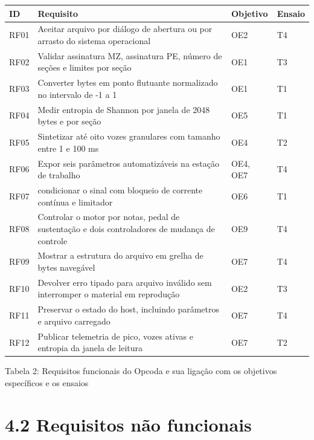 \documentclass[12pt,a4paper]{article}
\begin{document}
\begin{center}
\footnotesize
\setlength{\tabcolsep}{4pt}
\begin{tabular}{p{}|p{}|p{}|p{}}
\hline
\textbf{ID} & \textbf{Requisito} & \textbf{Objetivo} & \textbf{Ensaio} \\
\hline
RF01 & Aceitar arquivo por diálogo de abertura ou por arrasto do sistema operacional & OE2 & T4 \\
RF02 & Validar assinatura MZ, assinatura PE, número de seções e limites por seção & OE1 & T3 \\
RF03 & Converter bytes em ponto flutuante normalizado no intervalo de -1 a 1 & OE1 & T1 \\
RF04 & Medir entropia de Shannon por janela de 2048 bytes e por seção & OE5 & T1 \\
RF05 & Sintetizar até oito vozes granulares com tamanho entre 1 e 100 ms & OE4 & T2 \\
RF06 & Expor seis parâmetros automatizáveis na estação de trabalho & OE4, OE7 & T4 \\
RF07 & condicionar o sinal com bloqueio de corrente contínua e limitador & OE6 & T1 \\
RF08 & Controlar o motor por notas, pedal de sustentação e dois controladores de mudança de controle & OE9 & T4 \\
RF09 & Mostrar a estrutura do arquivo em grelha de bytes navegável & OE7 & T4 \\
RF10 & Devolver erro tipado para arquivo inválido sem interromper o material em reprodução & OE2 & T3 \\
RF11 & Preservar o estado do host, incluindo parâmetros e arquivo carregado & OE7 & T4 \\
RF12 & Publicar telemetria de pico, vozes ativas e entropia da janela de leitura & OE7 & T2 \\
\hline
\end{tabular}
\end{center}
\noindent Tabela 2: Requisitos funcionais do Opcoda e sua ligação com os objetivos específicos e os ensaios\par
\label{tab:2}
\vspace{2pt}{\footnotesize\noindent Elaborado pelos autores (2026).\par}

\section*{4.2 Requisitos não funcionais}
\end{document}
